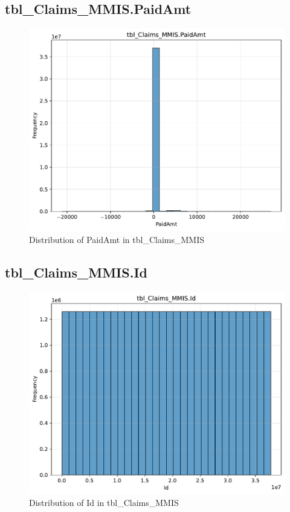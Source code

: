\subsection{tbl\_Claims\_MMIS.PaidAmt}

\begin{figure}[htbp]
\centering
\includegraphics[width=\textwidth]{figures/dbo_tbl_Claims_MMIS_PaidAmt.pdf}
\caption{Distribution of PaidAmt in tbl\_Claims\_MMIS}
\end{figure}\newpage

\subsection{tbl\_Claims\_MMIS.Id}

\begin{figure}[htbp]
\centering
\includegraphics[width=\textwidth]{figures/dbo_tbl_Claims_MMIS_Id.pdf}
\caption{Distribution of Id in tbl\_Claims\_MMIS}
\end{figure}\newpage

